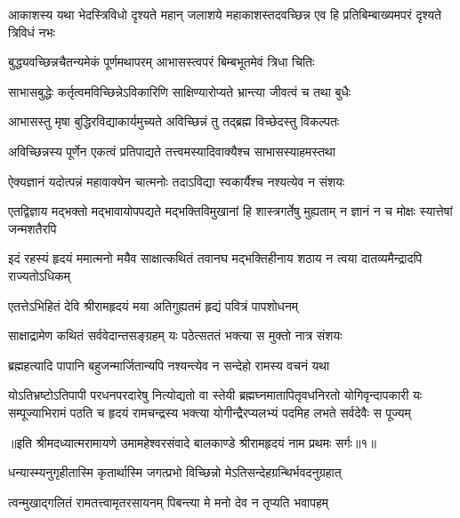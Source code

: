 \threelineshloka
{आकाशस्य यथा भेदस्त्रिविधो दृश्यते महान्}
{जलाशये महाकाशस्तदवच्छिन्न एव हि}
{प्रतिबिम्बाख्यमपरं दृश्यते त्रिविधं नभः} %

\twolineshloka
{बुद्ध्यवच्छिन्नचैतन्यमेकं पूर्णमथापरम्}
{आभासस्त्वपरं बिम्बभूतमेवं त्रिधा चितिः} %

\twolineshloka
{साभासबुद्धेः कर्तृत्वमविच्छिन्नेऽविकारिणि}
{साक्षिण्यारोप्यते भ्रान्त्या जीवत्वं च तथा बुधैः} %

\twolineshloka
{आभासस्तु मृषा बुद्धिरविद्याकार्यमुच्यते}
{अविच्छिन्नं तु तद्ब्रह्म विच्छेदस्तु विकल्पतः} %

\twolineshloka
{अविच्छिन्नस्य पूर्णेन एकत्वं प्रतिपाद्यते}
{तत्त्वमस्यादिवाक्यैश्च साभासस्याहमस्तथा} %

\twolineshloka
{ऐक्यज्ञानं यदोत्पन्नं महावाक्येन चात्मनोः}
{तदाऽविद्या स्वकार्यैश्च नश्यत्येव न संशयः} %

\threelineshloka
{एतद्विज्ञाय मद्भक्तो मद्भावायोपपद्यते}
{मद्भक्तिविमुखानां हि शास्त्रगर्तेषु मुह्यताम्}
{न ज्ञानं न च मोक्षः स्यात्तेषां जन्मशतैरपि} %

\fourlineindentedshloka
{इदं रहस्यं हृदयं ममात्मनो}
{मयैव साक्षात्कथितं तवानघ}
{मद्भक्तिहीनाय शठाय न त्वया}
{दातव्यमैन्द्रादपि राज्यतोऽधिकम्} %


\twolineshloka
{एतत्तेऽभिहितं देवि श्रीरामहृदयं मया}
{अतिगुह्यतमं हृद्यं पवित्रं पापशोधनम्} %

\twolineshloka
{साक्षाद्रामेण कथितं सर्ववेदान्तसङ्ग्रहम्}
{यः पठेत्सततं भक्त्या स मुक्तो नात्र संशयः} %

\twolineshloka
{ब्रह्महत्यादि पापानि बहुजन्मार्जितान्यपि}
{नश्यन्त्येव न सन्देहो रामस्य वचनं यथा} %

\fourlineindentedshloka
{योऽतिभ्रष्टोऽतिपापी परधनपरदारेषु नित्योद्यतो वा}
{स्तेयी ब्रह्मघ्नमातापितृवधनिरतो योगिवृन्दापकारी}
{यः सम्पूज्याभिरामं पठति च हृदयं रामचन्द्रस्य भक्त्या}
{योगीन्द्रैरप्यलभ्यं पदमिह लभते सर्वदेवैः स पूज्यम्} %

{॥इति श्रीमदध्यात्मरामायणे उमामहेश्वरसंवादे बालकाण्डे
श्रीरामहृदयं नाम प्रथमः सर्गः॥१॥
}





\twolineshloka
{धन्यास्म्यनुगृहीतास्मि कृतार्थास्मि जगत्प्रभो}
{विच्छिन्नो मेऽतिसन्देहग्रन्थिर्भवदनुग्रहात्} %

\twolineshloka
{त्वन्मुखाद्गलितं रामतत्त्वामृतरसायनम्}
{पिबन्त्या मे मनो देव न तृप्यति भवापहम्} %

